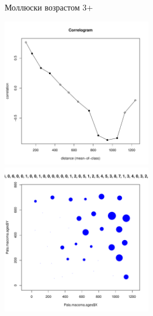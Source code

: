 	\begin{figure}[h]

	\begin{minipage}[b]{\linewidth}
	\begin{center}
		Моллюски возрастом 3+
	\end{center}
	\end{minipage}
	
	\begin{minipage}[b]{.46\linewidth}
	\begin{center}
		\includegraphics[width=65mm]{../Barenc_Sea/distribution_Moran/Pala_macoma_age_N3_.pdf}
	\end{center}
	\end{minipage}
	\hfil %
	\begin{minipage}[b]{.46\linewidth}
	\begin{center}
		\includegraphics[width=65mm]{../Barenc_Sea/distribution_Moran/Pala_macoma_age_bubb_N3_.pdf}
	\end{center}
	\end{minipage}


\end{figure}
